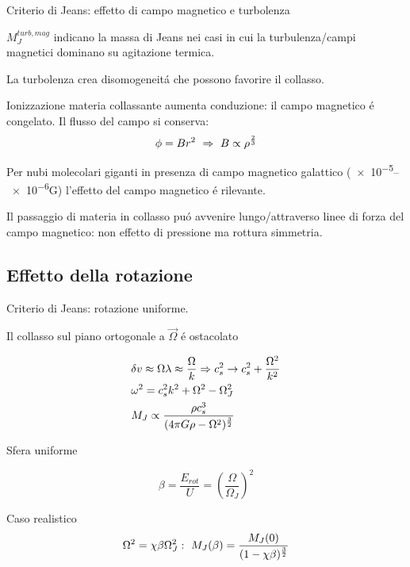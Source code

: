 \begin{wordonframe}{Criterio di Jeans: effetto di campo magnetico e turbolenza}

$M_J^{turb,mag}$ indicano la massa di Jeans nei casi in cui la turbulenza/campi magnetici dominano su agitazione termica.

La turbolenza crea disomogeneit\'a che possono favorire il collasso.

Ionizzazione materia collassante aumenta conduzione: il campo magnetico \'e congelato. Il flusso del campo si conserva:
\begin{equation*}
\phi=Br^2\ \Rightarrow\ B\propto\rho\expy{\frac{2}{3}}
\end{equation*}

Per nubi molecolari giganti in presenza di campo magnetico galattico (\numrange{e-5}{e-6}G) l'effetto del campo magnetico \'e rilevante.

Il passaggio di materia in collasso pu\'o avvenire lungo/attraverso linee di forza del campo magnetico: non effetto di pressione ma rottura simmetria.


\end{wordonframe}


\subsection{Effetto della rotazione}

\begin{frame}{Criterio di Jeans: rotazione uniforme.}

\begin{block}{Il collasso sul piano ortogonale a $\vec{\Omega}$ \'e ostacolato}

\begin{align*}
&\delta v\approx\Omega\lambda\approx\frac{\Omega}{k}\Rightarrow c_s^2\to c_s^2+\frac{\Omega^2}{k^2}\\
&\omega^2=c_s^2k^2+\Omega^2-\Omega_J^2\\
&M_J\propto\frac{\rho c_s^3}{(4\pi G\rho-\Omega^2)^{\frac{3}{2}}}
\end{align*}

\end{block}

\begin{block}{Sfera uniforme}

\begin{equation*}
\beta=\frac{E_{rot}}{U}=(\frac{\Omega}{\Omega_J})^2
\end{equation*}

\end{block}

\begin{block}{Caso realistico}
\begin{equation*}
\Omega^2=\chi\beta\Omega_J^2:\ M_J(\beta)=\frac{M_J(0)}{(1-\chi\beta)\expy{\frac{3}{2}}}
\end{equation*}
\end{block}

\end{frame}

